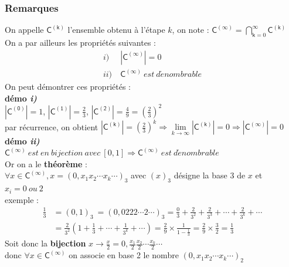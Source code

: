 \documentclass[a4paper,10pt]{report}
\begin{document}
\subsubsection{Remarques}
On appelle $\mathsf{C^{(k)}}$ l'ensemble obtenu à l'étape $k$, on note : $\mathsf{C^{(\infty)}} = \bigcap^{\infty}_{\mathsf{k}=0}\mathsf{C^{(k)}}$\\
On a par ailleurs les propriétés suivantes :
\begin{align*}
   i) \ & |\mathsf{C^{(\infty)}}|=0 \\
   ii) \ & \mathsf{C^{(\infty)}}\ est\ d\acute{e}nombrable
\end{align*}
On peut démontrer ces propriétés :\\
\textbf{démo \textit{i)}}\\
$|\mathsf{C^{(0)}}|=1$, $|\mathsf{C^{(1)}}|=\frac{2}{3}$, $|\mathsf{C^{(2)}}|=\frac{4}{9}=\left( \frac{2}{3} \right)^2$\\
par récurrence, on obtient $|\mathsf{C^{(k)}}|=\left( \frac{2}{3} \right)^k \Rightarrow \lim\limits_{k \rightarrow \infty} |\mathsf{C^{(k)}}|= 0 \Rightarrow |\mathsf{C^{(\infty)}}|=0$\\

\newpage
\noindent \textbf{démo \textit{ii)}}\\
$\mathsf{C^{(\infty)}}\ est\ en\ bijection\ avec\ [0,1] \Rightarrow \mathsf{C^{(\infty)}}\ est\ d\acute{e}nombrable $\\
Or on a le \textbf{théorème} :\\
$\forall x\in \mathsf{C^{(\infty)}}, x=(0,x_1x_2\cdots x_k\cdots)_3 $ avec $(x)_3$ désigne la base 3 de $x$ et $x_i = 0\ ou\ 2$\\
exemple :
\begin{align*}
   \frac{1}{3} & =(0,1)_3 \ = (0,0222\cdots 2\cdots)_3 = \frac{0}{3} + \frac{2}{3^2} + \frac{2}{3^3} + \cdots + \frac{2}{3^k} + \cdots\\
               & = \frac{2}{3^2} \left( 1 + \frac{1}{3} + \cdots + \frac{1}{3^k} + \cdots \right) = \frac{2}{9} \times \frac{1}{1-\frac{1}{3}} = \frac{2}{9}\times\frac{3}{2}=\frac{1}{3}
\end{align*}
Soit donc la \textbf{bijection} $x \longrightarrow \frac{x}{2}=0,\frac{x_1}{2}\frac{x_2}{2}\cdots\frac{x_k}{2}\cdots$\\
donc $\forall x\in \mathsf{C^{(\infty)}}$ on associe en base 2 le nombre $(0,x_1x_2\cdots x_k\cdots)_2$
\end{document}
